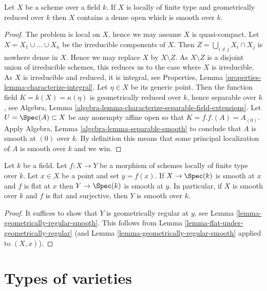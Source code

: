\begin{lemma}
\label{lemma-geometrically-reduced-dense-smooth-open}
Let $X$ be a scheme over a field $k$.
If $X$ is locally of finite type and geometrically reduced over $k$
then $X$ contains a dense open which is smooth over $k$.
\end{lemma}

\begin{proof}
The problem is local on $X$, hence we may assume $X$ is quasi-compact.
Let $X = X_1 \cup \ldots \cup X_n$ be the irreducible components of $X$.
Then $Z = \bigcup_{i \not = j} X_i \cap X_j$ is nowhere dense in $X$.
Hence we may replace $X$ by $X \setminus Z$. As $X \setminus Z$ is a
disjoint union of irreducible schemes, this reduces us to the case
where $X$ is irreducible. As $X$ is irreducible and reduced, it is
integral, see
Properties, Lemma \ref{properties-lemma-characterize-integral}.
Let $\eta \in X$ be its generic point.
Then the function field $K = k(X) = \kappa(\eta)$ is geometrically
reduced over $k$, hence separable over $k$, see
Algebra, Lemma \ref{algebra-lemma-characterize-separable-field-extensions}.
Let $U = \Spec(A) \subset X$ be any nonempty affine open
so that $K = f.f.(A) = A_{(0)}$. Apply
Algebra, Lemma \ref{algebra-lemma-separable-smooth}
to conclude that $A$ is smooth at $(0)$ over $k$.
By definition this means that some principal localization
of $A$ is smooth over $k$ and we win.
\end{proof}

\begin{lemma}
\label{lemma-flat-under-smooth}
Let $k$ be a field. Let $f : X \to Y$ be a morphism of schemes locally
of finite type over $k$. Let $x \in X$ be a point and set $y = f(x)$.
If $X \to \Spec(k)$ is smooth at $x$ and $f$ is flat at $x$
then $Y \to \Spec(k)$ is smooth at $y$. In particular, if $X$ is
smooth over $k$ and $f$ is flat and surjective, then $Y$ is smooth over $k$.
\end{lemma}

\begin{proof}
It suffices to show that $Y$ is geometrically regular at $y$, see
Lemma \ref{lemma-geometrically-regular-smooth}.
This follows from
Lemma \ref{lemma-flat-under-geometrically-regular}
(and
Lemma \ref{lemma-geometrically-regular-smooth}
applied to $(X, x)$).
\end{proof}




\section{Types of varieties}
\label{section-types}

